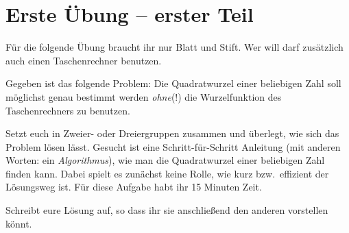 \clearpage

\rehead[]{\textcolor{lightblue}{AvHG, Inf, My}}
\lohead[]{\textcolor{lightblue}{AvHG, Inf, My}}

\section{Erste Übung -- erster Teil}

Für die folgende Übung braucht ihr nur Blatt und Stift. Wer will darf zusätzlich
auch einen Taschenrechner benutzen.

Gegeben ist das folgende Problem: Die Quadratwurzel einer beliebigen Zahl soll
möglichst genau bestimmt werden \emph{ohne}(!) die Wurzelfunktion des
Taschenrechners zu benutzen.

Setzt euch in Zweier- oder Dreiergruppen zusammen und überlegt, wie sich das
Problem lösen lässt. Gesucht ist eine Schritt-für-Schritt Anleitung (mit
anderen Worten: ein \emph{Algorithmus}), wie man die Quadratwurzel einer
beliebigen Zahl finden kann. Dabei spielt es zunächst keine Rolle, wie kurz
bzw.\ effizient der Lösungsweg ist. Für diese Aufgabe habt ihr 15 Minuten Zeit.

Schreibt eure Lösung auf, so dass ihr sie anschließend den anderen vorstellen
könnt.
